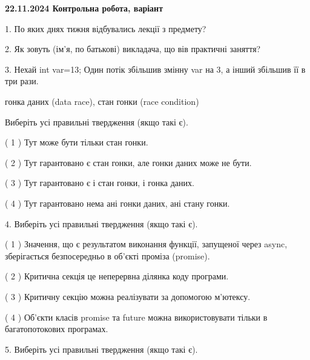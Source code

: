\documentclass[12pt, ukrainian]{article}
\begin{document}
\vspace{4mm}
\newpage
\begin {large}

\textbf{22.11.2024 Контрольна робота, варіант  }\par


{
1. По яких днях тижня відбувались лекції з предмету?



\vspace{5mm}
2. Як зовуть (ім'я, по батькові) викладача, що вів практичні заняття?



\vspace{5mm}
3. Нехай int var=13; Один потік збільшив змінну var на 3, а інший збільшив її в три рази.

гонка даних (data race), стан гонки (race condition)

Виберіть усі правильні твердження (якщо такі є).\par
\vspace{2mm}
( 1 ) Тут може бути тільки стан гонки.%

( 2 ) Тут гарантовано є стан гонки, але гонки даних може не бути.%

( 3 ) Тут гарантовано є і стан гонки, і гонка даних.%

( 4 ) Тут гарантовано нема ані гонки даних, ані стану гонки.%


\vspace{5mm}
4. Виберіть усі правильні твердження (якщо такі є).\par
\vspace{2mm}

( 1 ) Значення, що є результатом виконання функції, запущеної через async, зберігається безпосередньо в об’єкті проміза (promise).%

( 2 ) Критична секція це неперервна ділянка коду програми.%

( 3 ) Критичну секцію можна реалізувати за допомогою м’ютексу.%

( 4 ) Об’єкти класів promise та future можна використовувати тільки в багатопотокових програмах.%


\vspace{5mm}
5. Виберіть усі правильні твердження (якщо такі є).\par
\vspace{2mm}

}
\end{large}
\end{document}
